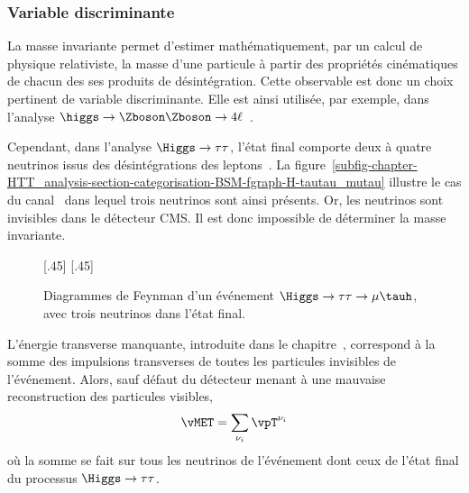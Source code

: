 \subsubsection{Variable discriminante}
La masse invariante permet d'estimer mathématiquement, par un calcul de physique relativiste, la masse d'une particule à partir des propriétés cinématiques de chacun des ses produits de désintégration.
Cette observable est donc un choix pertinent de variable discriminante.
Elle est ainsi utilisée, par exemple, dans l'analyse $\higgs\to\Zboson\Zboson\to4\ell$~\cite{CMS-PAS-HIG-13-002}.
\par
Cependant, dans l'analyse $\Higgs\to\tau\tau$, l'état final comporte deux à quatre neutrinos issus des désintégrations des leptons~\tau.
La figure~\ref{subfig-chapter-HTT_analysis-section-categorisation-BSM-fgraph-H-tautau_mutau} illustre le cas du canal \mu\tauh\ dans lequel trois neutrinos sont ainsi présents.
Or, les neutrinos sont invisibles dans le détecteur CMS.
Il est donc impossible de déterminer la masse invariante.
\begin{figure}[h]
\centering
\vspace{\baselineskip}

[.45\textwidth]
{}
\hfill
{}[.45\textwidth]
{}

\caption[Diagrammes de Feynman d'un événement $\Higgs\to\tau\tau\to\mu\tauh$.]{Diagrammes de Feynman d'un événement $\Higgs\to\tau\tau\to\mu\tauh$, avec trois neutrinos dans l'état final.}
\label{fig-chapter-HTT_analysis-section-categorisation-BSM-fgraph-H-tautau_mutau-for_mTtot}
\end{figure}
\par
L'énergie transverse manquante, introduite dans le chapitre~, correspond à la somme des impulsions transverses de toutes les particules invisibles de l'événement.
Alors, sauf défaut du détecteur menant à une mauvaise reconstruction des particules visibles,
\begin{equation}
\vMET = \sum_{\nu_i} \vpT^{\nu_i}
\end{equation}
où la somme se fait sur tous les neutrinos de l'événement dont ceux de l'état final du processus $\Higgs\to\tau\tau$.
